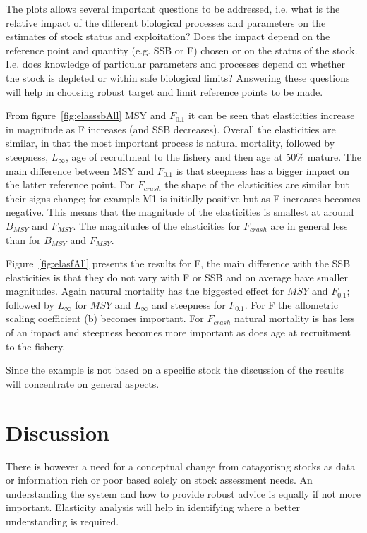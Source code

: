 \documentclass{pnastwo}
\begin{document}
\begin{article}
The plots allows several important questions to be addressed, i.e. what is the relative impact of the different biological processes and parameters 
on the estimates of stock status and exploitation? Does the impact depend on the reference point and quantity (e.g. SSB or F) chosen or on the status 
of the stock. I.e. does knowledge of particular parameters and processes depend on whether the stock is depleted or within safe biological limits? 
Answering these questions will help in choosing robust target and limit reference points to be made.

From figure~\ref{fig:elasssbAll} MSY and $F_{0.1}$ it can be seen that elasticities increase in magnitude as F increases (and SSB decreases). Overall the elasticities
are similar, in that the most important process is natural mortality, followed by steepness, $L_{\infty}$, age of recruitment to the fishery and then age at 50\% mature. 
The main difference between MSY and $F_{0.1}$ is that steepness has a bigger impact on the latter reference point. For $F_{crash}$ the shape of the elasticities
are similar but their signs change; for example M1 is initially positive but as F increases becomes negative. This means that the magnitude of the elasticities
is smallest at around $B_{MSY}$ and $F_{MSY}$. The magnitudes of the elasticities for $F_{crash}$ are in general less than for  $B_{MSY}$ and $F_{MSY}$. 

Figure~\ref{fig:elasfAll} presents the results for F, the main difference with the SSB elasticities is that they do not vary with F or SSB and on average have
smaller magnitudes. Again natural mortality has the biggested effect for $MSY$ and $F_{0.1}$; followed by $L_{\infty}$ for $MSY$ and  $L_{\infty}$ and steepness 
for $F_{0.1}$. For F the allometric scaling coefficient (b) becomes important. For $F_{crash}$ natural mortality is has less of an impact and steepness becomes 
more important as does age at recruitment to the fishery.   

Since the example is not based on a specific stock the discussion of the results will concentrate on general aspects.

\section{Discussion}

There is however a need for a conceptual change from catagorisng stocks as  data or information rich or poor based solely on stock assessment needs. An understanding the system and how to provide robust advice is equally if not more important. Elasticity analysis will  help in identifying where a better understanding is required.


\end{article}
\end{document}
